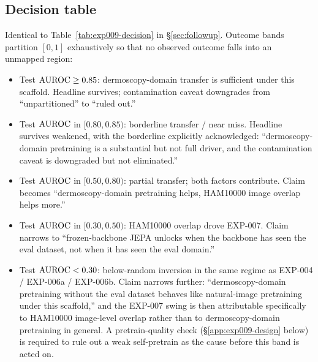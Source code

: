 \subsection{Decision table}
Identical to Table~\ref{tab:exp009-decision} in \S\ref{sec:followup}.
Outcome bands partition $[0, 1]$ exhaustively so that no observed
outcome falls into an unmapped region:
\begin{itemize}
\item Test $\mathrm{AUROC} \geq 0.85$: dermoscopy-domain transfer is sufficient
      under this scaffold. Headline survives; contamination caveat
      downgrades from ``unpartitioned'' to ``ruled out.''
\item Test $\mathrm{AUROC}$ in $[0.80, 0.85)$: borderline transfer / near miss.
      Headline survives weakened, with the borderline explicitly
      acknowledged: ``dermoscopy-domain pretraining is a substantial but
      not full driver, and the contamination caveat is downgraded but
      not eliminated.''
\item Test $\mathrm{AUROC}$ in $[0.50, 0.80)$: partial transfer; both factors
      contribute. Claim becomes ``dermoscopy-domain pretraining helps,
      HAM10000 image overlap helps more.''
\item Test $\mathrm{AUROC}$ in $[0.30, 0.50)$: HAM10000 overlap drove EXP-007.
      Claim narrows to ``frozen-backbone JEPA unlocks when the backbone
      has seen the eval dataset, not when it has seen the eval
      domain.''
\item Test $\mathrm{AUROC} < 0.30$: below-random inversion in the same regime
      as EXP-004 / EXP-006a / EXP-006b. Claim narrows further:
      ``dermoscopy-domain pretraining without the eval dataset behaves
      like natural-image pretraining under this scaffold,'' and the
      EXP-007 swing is then attributable specifically to HAM10000
      image-level overlap rather than to dermoscopy-domain pretraining
      in general. A pretrain-quality check (\S\ref{app:exp009-design}
      below) is required to rule out a weak self-pretrain as the
      cause before this band is acted on.
\end{itemize}

